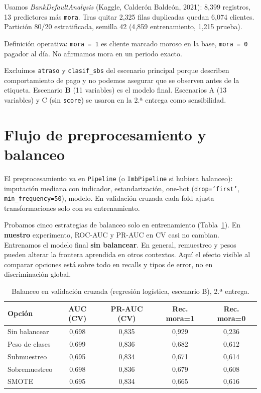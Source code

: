 \documentclass[11pt]{article}
\begin{document}
Usamos \textit{BankDefaultAnalysis} (Kaggle, Calderón Baldeón, 2021): 8{,}399 registros, 13 predictores más \texttt{mora}. Tras quitar 2{,}325 filas duplicadas quedan 6{,}074 clientes. Partición 80/20 estratificada, semilla 42 (4{,}859 entrenamiento, 1{,}215 prueba).

Definición operativa: \texttt{mora = 1} es cliente marcado moroso en la base, \texttt{mora = 0} pagador al día. No afirmamos mora en un periodo exacto.

Excluimos \texttt{atraso} y \texttt{clasif\_sbs} del escenario principal porque describen comportamiento de pago y no podemos asegurar que se observen antes de la etiqueta. Escenario \textbf{B} (11 variables) es el modelo final. Escenarios A (13 variables) y C (sin \texttt{score}) se usaron en la 2.ª entrega como sensibilidad.

\section{Flujo de preprocesamiento y balanceo}

El preprocesamiento va en \texttt{Pipeline} (o \texttt{ImbPipeline} si hubiera balanceo): imputación mediana con indicador, estandarización, one-hot (\texttt{drop='first'}, \texttt{min\_frequency=50}), modelo. En validación cruzada cada fold ajusta transformaciones solo con su entrenamiento.

Probamos cinco estrategias de balanceo solo en entrenamiento (Tabla~\ref{tab:balanceo}). En \textbf{nuestro} experimento, ROC-AUC y PR-AUC en CV casi no cambian. Entrenamos el modelo final \textbf{sin balancear}. En general, remuestreo y pesos pueden alterar la frontera aprendida en otros contextos. Aquí el efecto visible al comparar opciones está sobre todo en recalls y tipos de error, no en discriminación global.

\begin{table}[H]
\centering
\caption{Balanceo en validación cruzada (regresión logística, escenario B), 2.ª entrega.}
\label{tab:balanceo}
\small
\begin{tabular}{@{}lcccc@{}}
\toprule
\textbf{Opción} & \textbf{AUC (CV)} & \textbf{PR-AUC (CV)} & \textbf{Rec. mora=1} & \textbf{Rec. mora=0} \\
\midrule
Sin balancear & 0,698 & 0,835 & 0,929 & 0,236 \\
Peso de clases & 0,699 & 0,836 & 0,682 & 0,612 \\
Submuestreo & 0,695 & 0,834 & 0,671 & 0,614 \\
Sobremuestreo & 0,698 & 0,836 & 0,679 & 0,608 \\
SMOTE & 0,695 & 0,834 & 0,665 & 0,616 \\
\bottomrule
\end{tabular}
\end{table}
\end{document}
